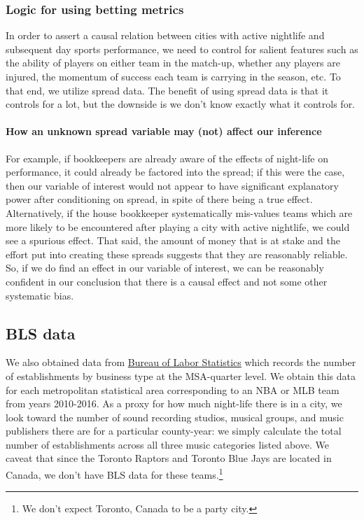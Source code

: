 \documentclass[letterpaper,12pt]{article}
\begin{document}

\subsubsection{Logic for using betting metrics}
In order to assert a causal relation between cities with active nightlife 
and subsequent day sports performance, we need to control for salient
features such as the ability of players on either team in the match-up,
whether any players are injured, the momentum of success each team is carrying
in the season, etc. To that end, we utilize spread data.\citep{anderson} The benefit of
using spread data is that it controls for a lot, but the downside is
we don't know exactly what it controls for.

\paragraph{How an unknown spread variable may (not) affect our inference}
For example, if bookkeepers
are already aware of the effects of night-life on performance, it could
already be factored into the spread; if this were the case, then our variable
of interest would not appear to have significant explanatory power
after conditioning on spread, in spite of there being
a true effect. Alternatively,
if the house bookkeeper systematically mis-values
teams which are more likely to be encountered after playing a city with active nightlife,
we could see a spurious effect. 
That said, the amount of money that is at stake and the effort put into creating these spreads 
suggests that they are reasonably reliable. 
So, if we do find an effect in our variable of interest,
we can be reasonably confident in our conclusion that there is a causal effect and not some other systematic bias.


\subsection{BLS data} We also obtained data from
\href{https://www.bls.gov/data/}{Bureau of Labor Statistics} which records the number of establishments by business type at the MSA-quarter level. We obtain this data for each metropolitan statistical area corresponding
to an NBA or MLB team from years 2010-2016. 
As a proxy for how much night-life there is in a city, we look toward the 
number of sound recording studios, musical groups, and music publishers there 
are for a particular county-year: we simply calculate the total number of establishments across all three music categories listed above. We caveat that since the Toronto Raptors and Toronto Blue Jays are located in Canada, 
we don't have BLS data for these teams.\footnote{We don't expect Toronto, Canada to be a party city.}
\end{document}
